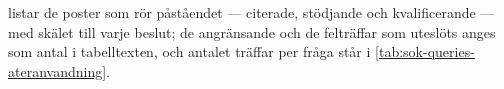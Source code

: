  listar de poster som rör påståendet ---
citerade, stödjande och kvalificerande --- med skälet till varje beslut;
de angränsande och de felträffar som uteslöts anges som antal i
tabelltexten, och antalet träffar per fråga står i
\cref{tab:sok-queries-ateranvandning}.


